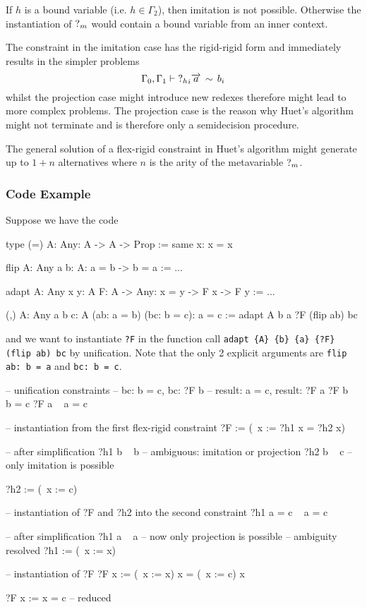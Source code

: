 If $h$ is a bound variable (i.e. $h\in \Gamma_2$), then imitation is not
possible. Otherwise the instantiation of ${?_{m}}$ would contain a bound
variable from an inner context.

The constraint in the imitation case has the rigid-rigid form and immediately
results in the simpler problems
$$
    \Gamma_0, \Gamma_1 \vdash {?_{h}}_i {\overrightarrow {a}} \,\sim\, b_i
$$
whilst the projection case might introduce new redexes therefore might lead to
more complex problems. The projection case is the reason why Huet's algorithm
might not terminate and is therefore only a semidecision procedure.

The general solution of a flex-rigid constraint in Huet's algorithm might
generate up to $1 + n$ alternatives where $n$ is the arity of the metavariable
${?_{m}}$.






\subsubsection{Code Example}

Suppose we have the code
\begin{alba}
    type (=) {A: Any}: A -> A -> Prop :=
        same {x}: x = x

    flip {A: Any} {a b: A}: a = b -> b = a :=
        ...

    adapt {A: Any} {x y: A} {F: A -> Any}: x = y -> F x -> F y :=
        ...

    (,) {A: Any} {a b c: A} (ab: a = b) (bc: b = c): a = c :=
        adapt {A} {b} {a} {?F} (flip ab) bc
\end{alba}
%
and we want to instantiate {\tt ?F} in the function call
{\tt adapt \{A\} \{b\} \{a\} \{?F\} (flip ab) bc}
by unification. Note that the only 2 explicit arguments are
{\tt flip ab: b = a} and {\tt bc: b = c}.

\begin{alba}
    -- unification constraints
    --    bc: b = c,      bc: ?F b
    --    result: a = c,  result: ?F a
    ?F b   ~   b = c
    ?F a   ~   a = c

    -- instantiation from the first flex-rigid constraint
    ?F := (\ x := ?h1 x = ?h2 x)

    -- after simplification
    ?h1 b  ~  b             -- ambiguous: imitation or projection
    ?h2 b  ~  c             -- only imitation is possible

    ?h2 := (\ x := c)

    -- instantiation of ?F and ?h2 into the second constraint
    ?h1 a = c    ~    a = c

    -- after simplification
    ?h1 a  ~  a             -- now only projection is possible
                            -- ambiguity resolved
    ?h1 := (\ x := x)

    -- instantiation of ?F
    ?F x := (\ x := x) x = (\ x := c) x

    ?F x := x = c   -- reduced
\end{alba}






